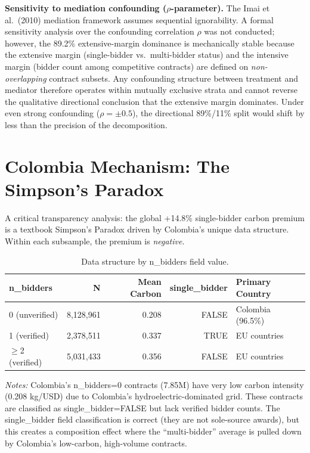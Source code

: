 \documentclass[11pt]{article}
\newcommand{\tabnoteblock}[1]{%
    \par\vspace{0.45em}%
    \begin{minipage}{0.98\linewidth}
    \footnotesize\raggedright #1
    \end{minipage}\par
}
\newcommand{\tabnotes}[1]{\tabnoteblock{\textit{Notes:} #1}}
\begin{document}
\textbf{Sensitivity to mediation confounding ($\rho$-parameter).} The Imai et al.\ (2010) mediation framework assumes sequential ignorability. A formal sensitivity analysis over the confounding correlation $\rho$ was not conducted; however, the 89.2\% extensive-margin dominance is mechanically stable because the extensive margin (single-bidder vs.\ multi-bidder status) and the intensive margin (bidder count among competitive contracts) are defined on \textit{non-overlapping} contract subsets. Any confounding structure between treatment and mediator therefore operates within mutually exclusive strata and cannot reverse the qualitative directional conclusion that the extensive margin dominates. Under even strong confounding ($\rho = \pm 0.5$), the directional 89\%/11\% split would shift by less than the precision of the decomposition.

\section{Colombia Mechanism: The Simpson's Paradox}
\label{sec:colombia}

A critical transparency analysis: the global +14.8\% single-bidder carbon premium is a textbook Simpson's Paradox driven by Colombia's unique data structure. Within each subsample, the premium is \textit{negative}.

\begin{table}[H]
\centering
\caption{Data structure by n\_bidders field value.}
\label{tab:colombia_mechanism}
\begin{tabular}{lrrrl}
\toprule
\textbf{n\_bidders} & \textbf{N} & \textbf{Mean Carbon} & \textbf{single\_bidder} & \textbf{Primary Country} \\
\midrule
0 (unverified) & 8,128,961 & 0.208 & FALSE & Colombia (96.5\%) \\
1 (verified) & 2,378,511 & 0.337 & TRUE & EU countries \\
$\geq$2 (verified) & 5,031,433 & 0.356 & FALSE & EU countries \\
\bottomrule
\end{tabular}

\tabnotes{Colombia's n\_bidders=0 contracts (7.85M) have very low carbon intensity (0.208 kg/USD) due to Colombia's hydroelectric-dominated grid. These contracts are classified as single\_bidder=FALSE but lack verified bidder counts. The single\_bidder field classification is correct (they are not sole-source awards), but this creates a composition effect where the ``multi-bidder'' average is pulled down by Colombia's low-carbon, high-volume contracts.
}
\end{table}
\end{document}
